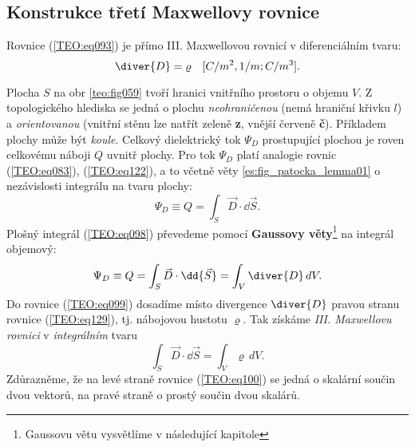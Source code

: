    \subsection{Konstrukce třetí Maxwellovy rovnice}\label{ES:ssec02}
      Rovnice (\ref{TEO:eq093}) je přímo III. Maxwellovou rovnicí v diferenciálním tvaru:
      \begin{equation}\label{TEO:eq129}
        \diver{D} = \varrho \quad [C/m^2, 1/m; C/m^3]. 
      \end{equation} 

      
      Plocha \(S\) na obr \ref{teo:fig059} tvoří hranici vnitřního prostoru o objemu \(V\). Z
      topologického hlediska se jedná o plochu \emph{neohraničenou} (nemá hraniční křivku \(l\)) a
      \emph{orientovanou} (vnitřní stěnu lze natřít zeleně \textbf{z}, vnější červeně \textbf{č}).
      Příkladem plochy může být \emph{koule}. Celkový dielektrický tok \(\Psi_D\) prostupující
      plochou je roven celkovému náboji \(Q\) uvnitř plochy. Pro tok \(\Psi_D\) platí analogie
      rovnic (\ref{TEO:eq083}), (\ref{TEO:eq122}), a to včetně věty \ref{es:fig_patocka_lemma01} o
      nezávislosti integrálu na tvaru plochy:
      \begin{equation}\label{TEO:eq098}
        \Psi_D \equiv Q = \int_S\vec{D}\cdot \dd{\vec{S}}.
      \end{equation} 
      Plošný integrál (\ref{TEO:eq098}) převedeme pomocí \textbf{Gaussovy 
      věty}\footnote{Gaussovu větu vysvětlíme v následující kapitole} na integrál objemový:
      \begin{equation}\label{TEO:eq099}
        \Psi_D \equiv Q = \int_S\vec{D}\cdot \dd{\vec{S}} = \int_V\diver{D}\,dV.
      \end{equation} 
      Do rovnice (\ref{TEO:eq099}) dosadíme místo divergence \(\diver{D}\) pravou stranu 
      rovnice (\ref{TEO:eq129}), tj. nábojovou hustotu \(\varrho\). Tak získáme \emph{III. 
      Maxwellovu rovnici} v \emph{integrálním} tvaru
      \begin{equation}\label{TEO:eq100}
        \boxed{\int_S\vec{D}\cdot \dd{\vec{S}} = \int_V\varrho\,dV}.
      \end{equation} 
      Zdůrazněme, že na levé straně rovnice (\ref{TEO:eq100}) se jedná o skalární součin 
      dvou vektorů, na pravé straně o prostý součin dvou skalárů.
      
